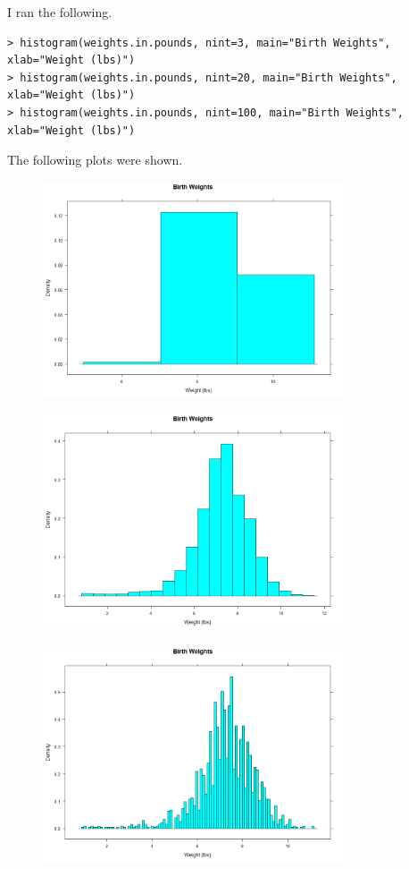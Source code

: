 \documentclass[12pt]{article}
\begin{document}
I ran the following.
\scriptsize
\begin{verbatim}
> histogram(weights.in.pounds, nint=3, main="Birth Weights", xlab="Weight (lbs)")
> histogram(weights.in.pounds, nint=20, main="Birth Weights", xlab="Weight (lbs)")
> histogram(weights.in.pounds, nint=100, main="Birth Weights", xlab="Weight (lbs)")
\end{verbatim}
\normalsize
The following plots were shown.
\begin{figure}[H]
    \begin{center}
        \includegraphics[width=3.5in]{section3problem2-3.png}
    \end{center}
\end{figure}
\begin{figure}[H]
    \begin{center}
        \includegraphics[width=3.5in]{section3problem2-20.png}
    \end{center}
\end{figure}
\begin{figure}[H]
    \begin{center}
        \includegraphics[width=3.5in]{section3problem2-100.png}
    \end{center}
\end{figure}
\end{document}
